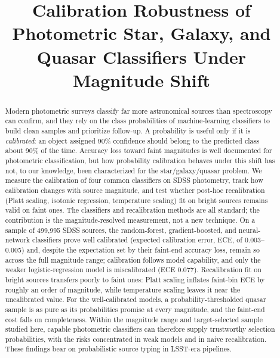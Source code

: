 \documentclass[conference]{IEEEtran}
\begin{document}
\title{Calibration Robustness of Photometric Star, Galaxy, and Quasar Classifiers Under Magnitude Shift}

\author{
}

\maketitle

\begin{abstract}
Modern photometric surveys classify far more astronomical sources than spectroscopy can confirm, and they rely on the class probabilities of machine-learning classifiers to build clean samples and prioritize follow-up. A probability is useful only if it is \emph{calibrated}: an object assigned 90\% confidence should belong to the predicted class about 90\% of the time. Accuracy loss toward faint magnitudes is well documented for photometric classification, but how probability calibration behaves under this shift has not, to our knowledge, been characterized for the star/galaxy/quasar problem. We measure the calibration of four common classifiers on SDSS photometry, track how calibration changes with source magnitude, and test whether post-hoc recalibration (Platt scaling, isotonic regression, temperature scaling) fit on bright sources remains valid on faint ones. The classifiers and recalibration methods are all standard; the contribution is the magnitude-resolved measurement, not a new technique. On a sample of 499{,}995 SDSS sources, the random-forest, gradient-boosted, and neural-network classifiers prove well calibrated (expected calibration error, ECE, of 0.003--0.005) and, despite the expectation set by their faint-end accuracy loss, remain so across the full magnitude range; calibration follows model capability, and only the weaker logistic-regression model is miscalibrated (ECE 0.077). Recalibration fit on bright sources transfers poorly to faint ones: Platt scaling inflates faint-bin ECE by roughly an order of magnitude, while temperature scaling leaves it near the uncalibrated value. For the well-calibrated models, a probability-thresholded quasar sample is as pure as its probabilities promise at every magnitude, and the faint-end cost falls on completeness. Within the magnitude range and target-selected sample studied here, capable photometric classifiers can therefore supply trustworthy selection probabilities, with the risks concentrated in weak models and in naive recalibration. These findings bear on probabilistic source typing in LSST-era pipelines.
\end{abstract}
\end{document}
